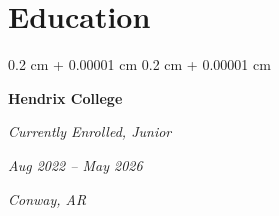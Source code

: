 \documentclass[10pt, letterpaper]{article}
\newenvironment{highlightsforbulletentries}{
    \begin{itemize}[
        topsep=0.10 cm,
        parsep=0.10 cm,
        partopsep=0pt,
        itemsep=0pt,
        leftmargin=10pt
    ]
}{
    \end{itemize}
} %
\newenvironment{onecolentry}{
    \begin{adjustwidth}{
        0.2 cm + 0.00001 cm
    }{
        0.2 cm + 0.00001 cm
    }
}{
    \end{adjustwidth}
} %
\newenvironment{twocolentry}[2][]{
    \onecolentry
    \def\secondColumn{#2}
    \setcolumnwidth{\fill, 4.5 cm}
    \begin{paracol}{2}
}{
    \switchcolumn \raggedleft \secondColumn
    \end{paracol}
    \endonecolentry
} %
\let\hrefWithoutArrow\href
\renewcommand{\href}[2]{\hrefWithoutArrow{#1}{\ifthenelse{\equal{#2}{}}{ }{#2 }\raisebox{.15ex}{\footnotesize \faExternalLink*}}}
\begin{document}



    









    \section{Education}

        \vspace{0.2cm}

        \begin{twocolentry}{
            \textit{Aug 2022 – May 2026}

            \textit{Conway, AR}
        }
        \textbf{Hendrix College}
            
        \textit{Currently Enrolled, Junior}
        \end{twocolentry}
\end{document}
